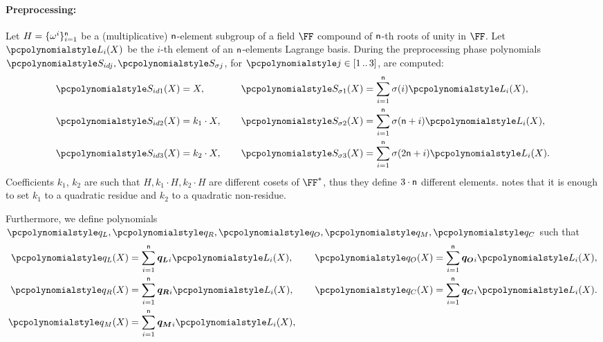 \documentclass[runningheads,11pt]{llncs}
\begin{document}
\paragraph{Preprocessing:}
Let $H = \{\omega^i\}_{i = 1}^{\mathsf{n} }$ be a
(multiplicative) $\mathsf{n}$-element subgroup of a field $\FF$
compound of $\mathsf{n}$-th roots of unity in $\FF$. Let $\lag_i(X)$ be
the $i$-th element of an $\mathsf{n}$-elements Lagrange basis. During
the preprocessing phase polynomials $\p{S_{id j}}, \p{S_{\sigma j}}$, for
$\p{j} \in \range{1}{3}$, are computed:
\begin{equation*}
  \begin{aligned}
    \p{S_{id 1}}(X) & = X,\vphantom{\sum_{i = 1}^{\noofc} \sigma(i) \lag_i(X),}\\
    \p{S_{id 2}}(X) & = k_1 \cdot X,\vphantom{\sum_{i = 1}^{\noofc} \sigma(i) \lag_i(X),}\\
    \p{S_{id 3}}(X) & = k_2 \cdot X,\vphantom{\sum_{i = 1}^{\noofc} \sigma(i) \lag_i(X),}
  \end{aligned}
  \qquad
\begin{aligned}
  \p{S_{\sigma 1}}(X) & = \sum_{i = 1}^{\noofc} \sigma(i) \lag_i(X),\\
  \p{S_{\sigma 2}}(X) & = \sum_{i = 1}^{\noofc}
  \sigma(\noofc + i) \lag_i(X),\\
  \p{S_{\sigma 3}}(X) & =\sum_{i = 1}^{\noofc} \sigma(2 \noofc + i) \lag_i(X).
\end{aligned}
\end{equation*}
Coefficients $k_1$, $k_2$ are such that $H, k_1 \cdot H, k_2 \cdot H$ are
different cosets of $\FF^*$, thus they define $3 \cdot \mathsf{n}$
different elements. \cite{EPRINT:GabWilCio19} notes that it is enough to set
$k_1$ to a quadratic residue and $k_2$ to a quadratic non-residue.

Furthermore, we define polynomials $\p{q_L}, \p{q_R}, \p{q_O}, \p{q_M}, \p{q_C}$
such that
\begin{equation*}
  \begin{aligned}
  \p{q_L}(X) & = \sum_{i = 1}^{\noofc} \vql_i \lag_i(X), \\
  \p{q_R}(X) & = \sum_{i = 1}^{\noofc} \vqr_i \lag_i(X), \\
  \p{q_M}(X) & = \sum_{i = 1}^{\noofc} \vqm_i \lag_i(X),
\end{aligned}
\qquad
\begin{aligned}
  \p{q_O}(X) & = \sum_{i = 1}^{\noofc} \vqo_i \lag_i(X), \\
  \p{q_C}(X) & = \sum_{i = 1}^{\noofc} \vqc_i \lag_i(X). \\
  \vphantom{\p{q_M}(X)  = \sum_{i = 1}^{\noofc} \vqm_i \lag_i(X),}
\end{aligned}
\end{equation*}
\end{document}
